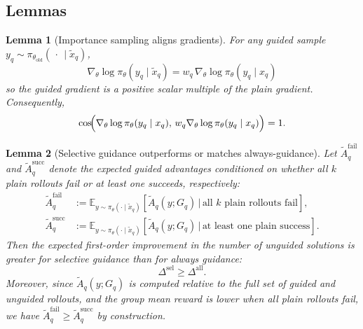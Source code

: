 \documentclass{article}
\newtheorem{lemma}{Lemma}
\begin{document}
{%
\subsection{Lemmas}

\begin{lemma}[Importance sampling aligns gradients]
\label{lem:alignment}
For any guided sample $y_q\sim\pi_{\theta_{\text{old}}}(\,\cdot\,\mid\tilde x_q)$,
\begin{equation}
\label{eq:alignment_eqn1}
\nabla_\theta \log \pi_\theta(y_q \mid \tilde x_q) = w_q\, \nabla_\theta \log \pi_\theta(y_q \mid x_q)
\end{equation}
so the guided gradient is a \emph{positive scalar multiple} of the plain gradient.  
Consequently,
\begin{equation}
\label{eq:alignment_cosine}
\cos\!\Bigl(
\nabla_\theta \log \pi_\theta(y_q \mid x_q),\,
w_q\nabla_\theta \log \pi_\theta(y_q \mid x_q)
\Bigr)
=1.
\end{equation}
\end{lemma}



\begin{lemma}[Selective guidance outperforms or matches always-guidance]
\label{lem:selective}
Let $\tilde A_q^{\text{fail}}$ and $\tilde A_q^{\text{succ}}$ denote the expected guided advantages conditioned on whether all $k$ plain rollouts fail or at least one succeeds, respectively:
\begin{align}
\tilde A_q^{\text{fail}} &:= \mathbb{E}_{y \sim \pi_\theta(\cdot \mid \tilde x_q)} \left[ \tilde A_q(y; G_q) \,\big|\, \text{all $k$ plain rollouts fail} \right], \\
\tilde A_q^{\text{succ}} &:= \mathbb{E}_{y \sim \pi_\theta(\cdot \mid \tilde x_q)} \left[ \tilde A_q(y; G_q) \,\big|\, \text{at least one plain success} \right].
\end{align}
Then the expected first-order improvement in the number of unguided solutions is greater for \emph{selective} guidance than for \emph{always} guidance:
\begin{equation}
\label{eq:delta_diff_cond}
\Delta^{\text{sel}} \ge \Delta^{\text{all}}.
\end{equation}
Moreover, since $\tilde A_q(y; G_q)$ is computed relative to the full set of guided and unguided rollouts, and the group mean reward is lower when all plain rollouts fail, we have $\tilde A_q^{\text{fail}} \ge \tilde A_q^{\text{succ}}$ by construction.
\end{lemma}

}
\end{document}
